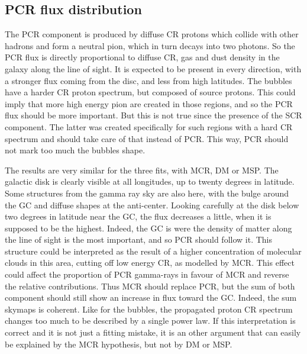 \subsection{PCR flux distribution}
The PCR component is produced by diffuse CR protons which collide with other hadrons and form a neutral pion, which in turn decays into two photons. So the PCR flux is directly proportional to diffuse CR, gas and dust density in the galaxy along the line of sight. It is expected to be present in every direction, with a stronger flux coming from the disc, and less from high latitudes.
The bubbles have a harder CR proton spectrum, but composed of source protons. This could imply that more high energy pion are created in those regions, and so the PCR flux should be more important. But this is not true since the presence of the SCR component. The latter was created specifically for such regions with a hard CR spectrum and should take care of that instead of PCR. This way, PCR should not mark too much the bubbles shape.

The results are very similar for the three fits, with MCR, DM or MSP. The galactic disk is clearly visible at all longitudes, up to twenty degrees in latitude. Some structures from the gamma ray sky are also here, with the bulge around the GC and diffuse shapes at the anti-center.
Looking carefully at the disk below two degrees in latitude near the GC, the flux decreases a little, when it is supposed to be the highest. Indeed, the GC is were the density of matter along the line of sight is the most important, and so PCR should follow it. This structure could be interpreted as the result of a higher concentration of molecular clouds in this area, cutting off low energy CR, as modelled by MCR. This effect could affect the proportion of PCR gamma-rays in favour of MCR and reverse the relative contributions. Thus MCR should replace PCR, but the sum of both component should still show an increase in flux toward the GC. Indeed, the sum skymaps  is coherent. Like for the bubbles, the propagated proton CR spectrum changes too much to be described by a single power law. If this interpretation is correct and it is not just a fitting mistake, it is an other argument that can easily be explained by the MCR hypothesis, but not by DM or MSP.


